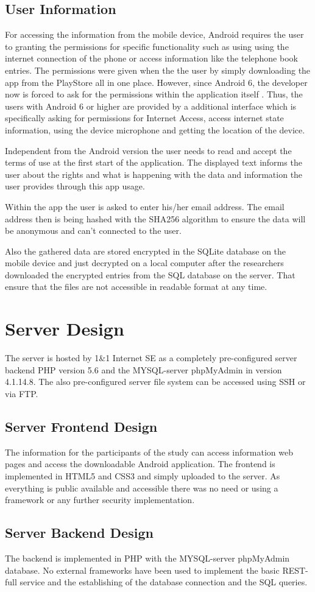 \begin{flushleft}
\subsection{User Information}
For accessing the information from the mobile device, Android requires the user to granting the permissions for specific functionality such as using using the internet connection of the phone or access information like the telephone book entries. 
The permissions were given when the the user by simply downloading the app from the PlayStore all in one place. However, since Android 6, the developer now is forced to ask for the permissions within the application itself  \cite{androidpermissions}. 
Thus, the users with Android 6 or higher are provided by a additional interface which is specifically asking for permissions for Internet Access, access internet state information, using the device microphone and getting the location of the device. 

Independent from the Android version the user needs to read and accept the terms of use at the first start of the application. The displayed text informs the user about the rights and what is happening with the data and information the user provides through this app usage.

Within the app the user is asked to enter his/her email address. The email address then is being hashed with the SHA256 algorithm to ensure the data will be anonymous and can't connected to the user.   

Also the gathered data are stored encrypted in the SQLite database on the mobile device and just decrypted on a local computer after the researchers downloaded the encrypted entries from the SQL database on the server. That ensure that the files are not accessible in readable format at any time. 
 
\end{flushleft}

\section{Server Design}
The server is hosted by 1\&1 Internet SE as a completely pre-configured server backend PHP version 5.6 and the MYSQL-server phpMyAdmin in version 4.1.14.8. The also pre-configured server file system can be accessed using SSH or via FTP.

\subsection{Server Frontend Design}
The information for the participants of the study can access information web pages and access the downloadable Android application.
The frontend is implemented in HTML5 and CSS3 and simply uploaded to the server. As everything is public available and accessible there was no need or using a framework or any further security implementation. 

\subsection{Server Backend Design}
The backend is implemented in PHP with the MYSQL-server phpMyAdmin database. 
No external frameworks have been used to implement the basic REST-full service and the establishing of the database connection and the SQL queries. 
